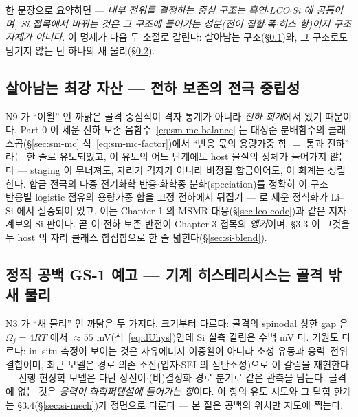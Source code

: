 한 문장으로 요약하면 --- \emph{내부 전위를 결정하는 중심 구조는 흑연$\cdot$LCO$\cdot$Si 에 공통이며,
Si 접목에서 바뀌는 것은 그 구조에 들어가는 성분(전이 집합$\cdot$폭$\cdot$히스 항)이지 구조 자체가
아니다}. 이 명제가 다음 두 소절로 갈린다: 살아남는 구조(\S\ref{ssec:si-anchor-body})와, 그 구조로도
담기지 않는 단 하나의 새 물리(\S\ref{ssec:si-newphys-body}).

\subsection{살아남는 최강 자산 --- 전하 보존의 전극 중립성}\label{ssec:si-anchor-body}
N9 가 ``이월'' 인 까닭은 골격 중심식이 격자 통계가 아니라 \emph{전하 회계}에서 왔기 때문이다. Part 0 이
세운 전하 보존 음함수~\eqref{eq:sm-mc-balance} 는 대정준 분배함수의 클래스곱(\S\ref{sec:sm-mc}
식~\eqref{eq:sm-mc-factor})에서 ``반응 몫의 용량가중 합 $=$ 통과 전하'' 라는 한 줄로 유도되었고, 이
유도의 어느 단계에도 host 물질의 정체가 들어가지 않는다 --- staging 이 무너져도, 자리가 격자가 아니라
비정질 합금이어도, 이 회계는 성립한다. 합금 전극의 다중 전기화학 반응$\cdot$화학종 분화(speciation)를
정확히 이 구조 --- 반응별 logistic 점유의 용량가중 합을 고정 전하에서 뒤집기 --- 로 세운 정식화가
Li--Si 에서 실증되어 있고\cite{verbrugge_lisi2016}, 이는 Chapter 1 의 MSMR 대응(\S\ref{sec:lco-code})과
같은 저자 계보의 Si 판이다. 곧 이 전하 보존 반전이 Chapter 3 접목의 \emph{앵커}이며, §3.3 이 그것을 두
host 의 자리 클래스 합집합으로 한 줄 넓힌다(\S\ref{sec:si-blend}).

\subsection{정직 공백 GS-1 예고 --- 기계 히스테리시스는 골격 밖 새 물리}\label{ssec:si-newphys-body}
N3 가 ``새 물리'' 인 까닭은 두 가지다. 크기부터 다르다: 골격의 spinodal 상한 gap 은
$\Omega_j{=}4RT$ 에서 $\approx55$ mV(식~\eqref{eq:dUhys})인데 Si 실측 갈림은 수백 mV 다\cite{obrovac_chevrier2014}.
기원도 다르다: in~situ 측정이 보이는 것은 자유에너지 이중웰이 아니라 소성 유동과 응력--전위
결합이며\cite{sethuraman_stressevo2010,sethuraman_stresspot2010}, 최근 모델은 경로 의존 소산(입자$\cdot$SEI
의 점탄소성)으로 이 갈림을 재현한다\cite{koebbing2024} --- 선행 현상학 모델은 다단 상전이$\cdot$(비)결정화
경로 분기로 같은 관측을 담는다\cite{jiang_sihys2020}. 골격에 없는 것은 \emph{응력이 화학퍼텐셜에 들어가는
항}이다. 이 항의 유도 시도와 그 닫힘 한계는 §3.4(\S\ref{sec:si-mech})가 정면으로 다룬다 --- 본 절은
공백의 위치만 지도에 찍는다.


